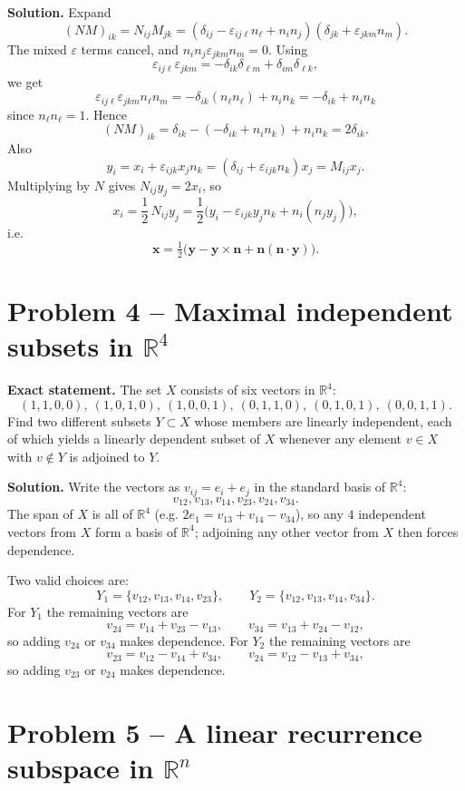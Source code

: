 \documentclass[12pt,a4paper]{article}
\theoremstyle{plain}
\theoremstyle{definition}      %
\begin{document}
\textbf{Solution.}
Expand
\[
(NM)_{ik}=N_{ij}M_{jk}
=(\delta_{ij}-\varepsilon_{ij\ell}n_\ell+n_in_j)(\delta_{jk}+\varepsilon_{jkm}n_m).
\]
The mixed $\varepsilon$ terms cancel, and $n_in_j\varepsilon_{jkm}n_m=0$.
Using
\[
\varepsilon_{ij\ell}\varepsilon_{jkm}=-\delta_{ik}\delta_{\ell m}+\delta_{im}\delta_{\ell k},
\]
we get
\[
\varepsilon_{ij\ell}\varepsilon_{jkm}n_\ell n_m=-\delta_{ik}(n_\ell n_\ell)+n_in_k=-\delta_{ik}+n_in_k
\]
since $n_\ell n_\ell=1$. Hence
\[
(NM)_{ik}=\delta_{ik}-(-\delta_{ik}+n_in_k)+n_in_k=2\delta_{ik}.
\]
Also
\[
y_i=x_i+\varepsilon_{ijk}x_jn_k=(\delta_{ij}+\varepsilon_{ijk}n_k)x_j=M_{ij}x_j.
\]
Multiplying by $N$ gives $N_{ij}y_j=2x_i$, so
\[
x_i=\frac12\,N_{ij}y_j
=\frac12\big(y_i-\varepsilon_{ijk}y_jn_k+n_i(n_jy_j)\big),
\]
i.e.
\[
\mathbf x=\tfrac12\big(\mathbf y-\mathbf y\times\mathbf n+\mathbf n(\mathbf n\cdot\mathbf y)\big).
\]

\section*{Problem 4 -- Maximal independent subsets in $\mathbb{R}^4$}

\textbf{Exact statement.}
The set $X$ consists of six vectors in $\mathbb{R}^4$:
\[
(1,1,0,0),\ (1,0,1,0),\ (1,0,0,1),\ (0,1,1,0),\ (0,1,0,1),\ (0,0,1,1).
\]
Find two different subsets $Y\subset X$ whose members are linearly independent, each of which yields a linearly dependent subset of $X$ whenever any element $v\in X$ with $v\notin Y$ is adjoined to $Y$.

\textbf{Solution.}
Write the vectors as $v_{ij}=e_i+e_j$ in the standard basis of $\mathbb R^4$:
\[
v_{12},v_{13},v_{14},v_{23},v_{24},v_{34}.
\]
The span of $X$ is all of $\mathbb R^4$ (e.g. $2e_1=v_{13}+v_{14}-v_{34}$), so any $4$ independent vectors from $X$ form a basis of $\mathbb R^4$; adjoining any other vector from $X$ then forces dependence.

Two valid choices are:
\[
Y_1=\{v_{12},v_{13},v_{14},v_{23}\},\qquad
Y_2=\{v_{12},v_{13},v_{14},v_{34}\}.
\]
For $Y_1$ the remaining vectors are
\[
v_{24}=v_{14}+v_{23}-v_{13},\qquad
v_{34}=v_{13}+v_{24}-v_{12},
\]
so adding $v_{24}$ or $v_{34}$ makes dependence.
For $Y_2$ the remaining vectors are
\[
v_{23}=v_{12}-v_{14}+v_{34},\qquad
v_{24}=v_{12}-v_{13}+v_{34},
\]
so adding $v_{23}$ or $v_{24}$ makes dependence.

\section*{Problem 5 -- A linear recurrence subspace in $\mathbb{R}^n$}
\end{document}
